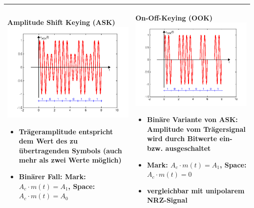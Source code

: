 \begin{longtable}{|p{9cm}|p{9cm}|}
	\hline
	\textbf{Amplitude Shift Keying (ASK)}\newline
	\includegraphics[width=8cm]{bilder/DigitaleTraegermodulation/ASK.png}
	\begin{itemize}[noitemsep]
		\item Trägeramplitude entspricht dem Wert des zu übertragenden Symbols (auch mehr als zwei Werte möglich)
		\item Binärer Fall: \textbf{Mark:} $A_c \cdot m(t) = A_1$, \newline \textbf{Space:} $A_c \cdot m(t) = A_0$
	\end{itemize}
	&
	\textbf{On-Off-Keying (OOK)}\newline
	\includegraphics[width=8cm]{bilder/DigitaleTraegermodulation/OOK.png}
	\begin{itemize}[noitemsep]
		\item Binäre Variante von ASK: Amplitude vom Trägersignal wird durch Bitwerte ein- bzw. ausgeschaltet
		\item \textbf{Mark:} $A_c \cdot m(t) = A_1$, \textbf{Space:} $A_c \cdot m(t) = 0$
		\item vergleichbar mit unipolarem NRZ-Signal
	\end{itemize}\\
	
	\hline
	

\end{longtable}
